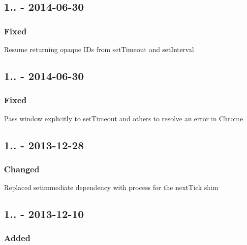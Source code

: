 \subsection*{1.. -\/ 2014-\/06-\/30}

\subsubsection*{Fixed}


\begin{DoxyItemize}
\item Resume returning opaque I\+Ds from {\ttfamily set\+Timeout} and {\ttfamily set\+Interval}
\end{DoxyItemize}

\subsection*{1.. -\/ 2014-\/06-\/30}

\subsubsection*{Fixed}


\begin{DoxyItemize}
\item Pass {\ttfamily window} explicitly to {\ttfamily set\+Timeout} and others to resolve an error in Chrome
\end{DoxyItemize}

\subsection*{1.. -\/ 2013-\/12-\/28}

\subsubsection*{Changed}


\begin{DoxyItemize}
\item Replaced {\ttfamily setimmediate} dependency with {\ttfamily process} for the {\ttfamily next\+Tick} shim
\end{DoxyItemize}

\subsection*{1.. -\/ 2013-\/12-\/10}

\subsubsection*{Added}


